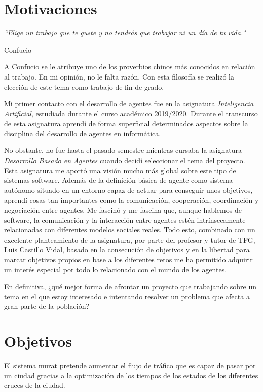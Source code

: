 \section{Motivaciones}
\epigraph{\textit{``Elige un trabajo que te guste y no tendrás que trabajar ni un día de tu vida."}}{Confucio}

A Confucio se le atribuye uno de los proverbios chinos más conocidos en relación al trabajo. En mi opinión, no le falta razón. Con esta filosofía se realizó la elección de este tema como trabajo de fin de grado.

Mi primer contacto con el desarrollo de agentes fue en la asignatura \textit{Inteligencia Artificial}, estudiada durante el curso académico 2019/2020. Durante el transcurso de esta asignatura aprendí de forma superficial determinados aspectos sobre la disciplina del desarrollo de agentes en informática.

No obstante, no fue hasta el pasado semestre mientras cursaba la asignatura \textit{Desarrollo Basado en Agentes} cuando decidí seleccionar el tema del proyecto. Esta asignatura me aportó una visión mucho más global sobre este tipo de sistemas software. Además de la definición básica de agente como sistema autónomo situado en un entorno capaz de actuar para conseguir unos objetivos, aprendí cosas tan importantes como la comunicación, cooperación, coordinación y negociación entre agentes. Me fascinó y me fascina que, aunque hablemos de software, la comunicación y la interacción entre agentes estén intrínsecamente relacionadas con diferentes modelos sociales reales. Todo esto, combinado con un excelente planteamiento de la asignatura, por parte del profesor y tutor de TFG, Luis Castillo Vidal, basado en la consecución de objetivos y en la libertad para marcar objetivos propios en base a los diferentes retos me ha permitido adquirir un interés especial por todo lo relacionado con el mundo de los agentes.
    
En definitiva, ¿qué mejor forma de afrontar un proyecto que trabajando sobre un tema en el que estoy interesado e intentando resolver un problema que afecta a gran parte de la población?

\section{Objetivos}
El sistema \acrshort{murat} pretende aumentar el flujo de tráfico que es capaz de pasar por un ciudad gracias a la optimización de los tiempos de los estados de los diferentes cruces de la ciudad.

